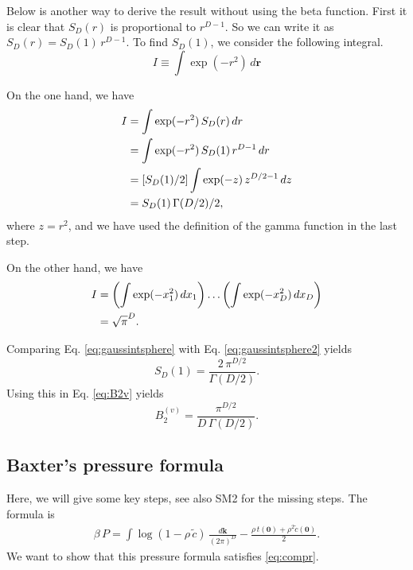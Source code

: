 \documentclass[preprint]{revtex4-1}
\numberwithin{equation}{subsection}
\numberwithin{table}{section}
\newcommand{\vct}[1]{\mathbf{#1}}
\providecommand{\vr}{} %
\renewcommand{\vr}{\vct{r}}
\newcommand{\vk}{\vct{k}}
\newcommand{\dvk}{\frac{d\vk}{(2\pi)^D}}
\begin{document}
Below is another way to derive the result without using the beta function.
%
First it is clear that $S_D(r)$ is proportional to $r^{D-1}$.
So we can write it as $S_D(r) = S_D(1) \, r^{D-1}$.
To find $S_D(1)$, we consider the following integral.
\[
I
\equiv
\int \exp(-r^2) \, d\vr
\]

On the one hand, we have
\begin{align}
  I
&=
  \int \exp(-r^2) \, S_D(r) \, d r
  \notag \\
&=
  \int \exp(-r^2) \, S_D(1) \, r^{D-1} \, dr
  \notag \\
&=
  [S_D(1)/2]
  \int \exp(-z) \, z^{D/2 - 1} \, dz
  \notag \\
&=
  S_D(1) \, \Gamma(D/2)/2,
\label{eq:gaussintsphere}
\end{align}
%
where $z = r^2$,
and we have used the definition of the gamma function in the last step.

On the other hand, we have
\begin{align}
  I
&=
  \left( \int \exp(-x_1^2) \, d x_1 \right)
  \dots
  \left( \int \exp(-x_D^2) \, d x_D \right) \notag \\
&=
  \sqrt\pi^D.
\label{eq:gaussintsphere2}
\end{align}

Comparing Eq. \eqref{eq:gaussintsphere} with Eq. \eqref{eq:gaussintsphere2}
yields
\begin{equation}
  S_D(1) = \frac{ 2 \, \pi^{D/2} } { \Gamma(D/2) }.
  \label{eq:surfareaD}
\end{equation}
Using this in Eq. \eqref{eq:B2v} yields
\[
  B_2^{(v)}
=
  \frac{ \pi^{D/2} } { D \, \Gamma(D/2) }.
\]



\subsection{Baxter's pressure formula}

Here, we will give some key steps, see also SM2 
for the missing steps.
%
The formula is
\begin{align}
\beta \, P
=
\int
    \log(1 - \rho \, \tilde c)
   \, \dvk
  -
    \frac{\rho \, t(\vct{0}) + \rho^2 \tilde{c}(\vct{0}) } {2}.
  \label{eq:Pbaxter}
\end{align}
We want to show that this pressure formula satisfies \eqref{eq:compr}.
\end{document}
